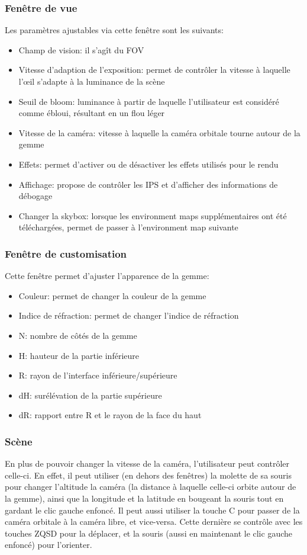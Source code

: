 \documentclass[a4paper,12pt]{article}
\begin{document}
\subsubsection{Fenêtre de vue}
Les paramètres ajustables via cette fenêtre sont les suivants:
\begin{itemize}
    \item Champ de vision: il s'agît du FOV
    \item Vitesse d'adaption de l'exposition: permet de contrôler la vitesse à laquelle l'œil s'adapte à la luminance de la scène
    \item Seuil de bloom: luminance à partir de laquelle l'utilisateur est considéré comme ébloui, résultant en un flou léger
    \item Vitesse de la caméra: vitesse à laquelle la caméra orbitale tourne autour de la gemme
    \item Effets: permet d'activer ou de désactiver les effets utilisés pour le rendu
    \item Affichage: propose de contrôler les IPS et d'afficher des informations de débogage
    \item Changer la skybox: lorsque les environment maps supplémentaires ont été téléchargées, permet de passer à l'environment map suivante
\end{itemize}

\subsubsection{Fenêtre de customisation}
Cette fenêtre permet d'ajuster l'apparence de la gemme:
\begin{itemize}
    \item Couleur: permet de changer la couleur de la gemme
    \item Indice de réfraction: permet de changer l'indice de réfraction
    \item N: nombre de côtés de la gemme
    \item H: hauteur de la partie inférieure
    \item R: rayon de l'interface inférieure/supérieure
    \item dH: surélévation de la partie supérieure
    \item dR: rapport entre R et le rayon de la face du haut
\end{itemize}

\subsubsection{Scène}
En plus de pouvoir changer la vitesse de la caméra, l'utilisateur peut contrôler celle-ci. En effet,
il peut utiliser (en dehors des fenêtres) la molette de sa souris pour changer l'altitude la caméra
(la distance à laquelle celle-ci orbite autour de la gemme), ainsi que la longitude et la latitude
en bougeant la souris tout en gardant le clic gauche enfoncé. Il peut aussi utiliser la touche C pour
passer de la caméra orbitale à la caméra libre, et vice-versa. Cette dernière se contrôle avec les
touches ZQSD pour la déplacer, et la souris (aussi en maintenant le clic gauche enfoncé)
pour l'orienter.
\end{document}
